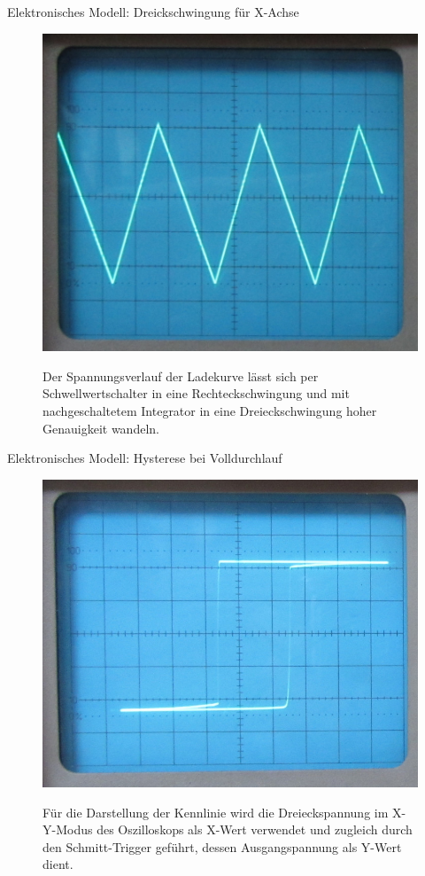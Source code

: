 \documentclass{beamer}
\begin{document}
\begin{frame}{Elektronisches Modell: Dreickschwingung für X-Achse}
  \begin{figure}
    \centering
    \label{fig:sawtooth}
    {\includegraphics[width=0.5\paperwidth,center]
      {../images/sawtooth.jpg}}
    \caption{Der Spannungsverlauf der Ladekurve lässt sich per
      Schwellwertschalter in eine Rechteckschwingung und mit
      nachgeschaltetem Integrator in eine Dreieckschwingung hoher
      Genauigkeit wandeln.}
  \end{figure}
\end{frame}

\begin{frame}{Elektronisches Modell: Hysterese bei Volldurchlauf}
  \begin{figure}
    \centering
    \label{fig:hysteresis}
    {\includegraphics[width=0.5\paperwidth,center]
      {../images/hysteresis.jpg}}
    \caption{Für die Darstellung der Kennlinie wird die
      Dreieckspannung im X-Y-Modus des Oszilloskops als X-Wert
      verwendet und zugleich durch den Schmitt-Trigger geführt, dessen
      Ausgangspannung als Y-Wert dient.}
  \end{figure}
\end{frame}
\end{document}
